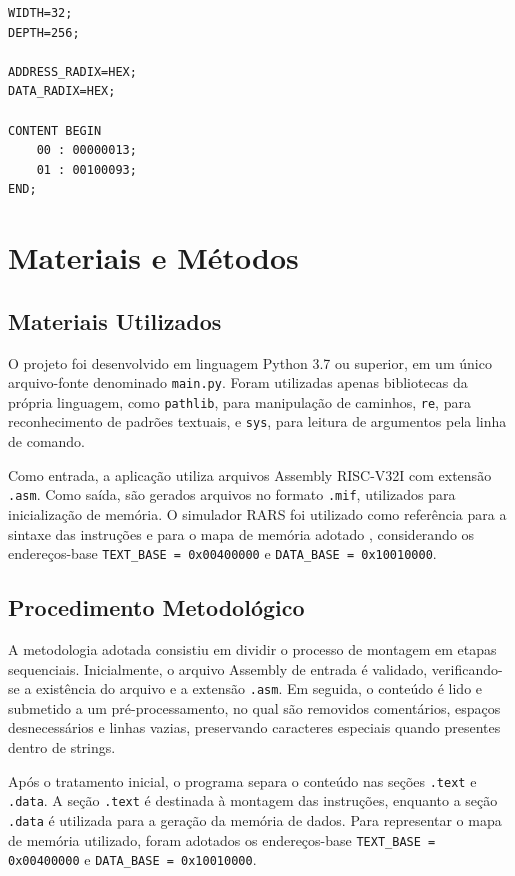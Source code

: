 \documentclass[conference]{IEEEtran}
\begin{document}
\begin{lstlisting}[style=asmstyle, caption={Estrutura geral de um arquivo MIF.}, label={lst:exemplomif}]
WIDTH=32;
DEPTH=256;

ADDRESS_RADIX=HEX;
DATA_RADIX=HEX;

CONTENT BEGIN
    00 : 00000013;
    01 : 00100093;
END;
\end{lstlisting}

\section{Materiais e Métodos}

\subsection{Materiais Utilizados}

O projeto foi desenvolvido em linguagem Python 3.7 ou superior, em um único arquivo-fonte denominado \texttt{main.py}. Foram utilizadas apenas bibliotecas da própria linguagem, como \texttt{pathlib}, para manipulação de caminhos, \texttt{re}, para reconhecimento de padrões textuais, e \texttt{sys}, para leitura de argumentos pela linha de comando.

Como entrada, a aplicação utiliza arquivos Assembly RISC-V32I com extensão \texttt{.asm}. Como saída, são gerados arquivos no formato \texttt{.mif}, utilizados para inicialização de memória. O simulador RARS foi utilizado como referência para a sintaxe das instruções e para o mapa de memória adotado \cite{rars}, considerando os endereços-base \texttt{TEXT\_BASE = 0x00400000} e \texttt{DATA\_BASE = 0x10010000}.

\subsection{Procedimento Metodológico}

A metodologia adotada consistiu em dividir o processo de montagem em etapas sequenciais. Inicialmente, o arquivo Assembly de entrada é validado, verificando-se a existência do arquivo e a extensão \texttt{.asm}. Em seguida, o conteúdo é lido e submetido a um pré-processamento, no qual são removidos comentários, espaços desnecessários e linhas vazias, preservando caracteres especiais quando presentes dentro de strings.

Após o tratamento inicial, o programa separa o conteúdo nas seções \texttt{.text} e \texttt{.data}. A seção \texttt{.text} é destinada à montagem das instruções, enquanto a seção \texttt{.data} é utilizada para a geração da memória de dados. Para representar o mapa de memória utilizado, foram adotados os endereços-base \texttt{TEXT\_BASE = 0x00400000} e \texttt{DATA\_BASE = 0x10010000}.
\end{document}
